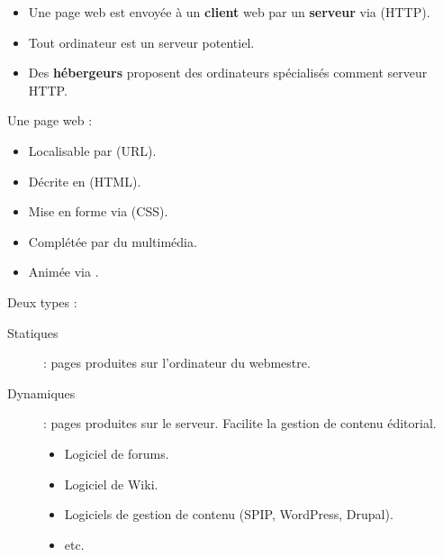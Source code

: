 \begin{slide}
	\begin{itemize}
		\item Une page web est envoyée à un \textbf{client} web par un \textbf{serveur} via  (HTTP).
		\item Tout ordinateur est un serveur potentiel.
		\item Des \textbf{hébergeurs} proposent des  ordinateurs spécialisés comment serveur HTTP.
	\end{itemize}
\end{slide}

\begin{slide}
	Une page web :
	\begin{itemize}
		\item Localisable par  (URL).
		\item Décrite en  (HTML).
		\item Mise en forme via  (CSS).
		\item Complétée par du multimédia.
		\item Animée via . %
	\end{itemize}

\end{slide}

\begin{slide}
	Deux types : %
	\begin{description}
		\item[Statiques] : pages produites sur l'ordinateur du webmestre.
		\item[Dynamiques] : pages produites sur le serveur. Facilite la gestion de contenu éditorial.
		\begin{itemize}
			\item Logiciel de forums.
			\item Logiciel de Wiki.
			\item Logiciels de gestion de contenu (SPIP, WordPress, Drupal).
			\item etc. %
		\end{itemize} 
	\end{description}
\end{slide}
